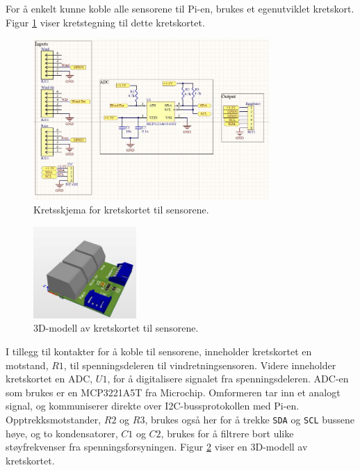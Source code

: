 For å enkelt kunne koble alle sensorene til Pi-en, brukes et egenutviklet kretskort.
Figur \ref{fig:sensorkretskort_krets} viser kretstegning til dette kretskortet.

\begin{figure}[H]
    \centering
    \includegraphics[width=0.8\textwidth]{implementering/vaer/sensorkretskort_krets.png}
    \caption{Kretsskjema for kretskortet til sensorene.}
    \label{fig:sensorkretskort_krets}
\end{figure}


\begin{figure}
    \centering
    \includegraphics[width=0.35\textwidth]{implementering/vaer/sensorkretskort_3d.png}
    \caption{3D-modell av kretskortet til sensorene.}
    \label{fig:sensorkretskort_3d}
\end{figure}

I tillegg til kontakter for å koble til sensorene, inneholder kretskortet en motstand, $R1$, til spenningsdeleren til vindretningsensoren. 
Videre inneholder kretskortet en ADC, $U1$, for å digitalisere signalet fra spenningsdeleren. 
ADC-en som brukes er en MCP3221A5T fra Microchip\cite{adc}. 
Omformeren tar inn et analogt signal, og kommuniserer direkte over I2C-bussprotokollen med Pi-en. 
Opptrekksmotstander, $R2$ og $R3$, brukes også her for å trekke \texttt{SDA} og \texttt{SCL} bussene høye, og to kondensatorer, $C1$ og $C2$, brukes for å filtrere bort ulike støyfrekvenser fra spenningsforsyningen. 
Figur \ref{fig:sensorkretskort_3d} viser en 3D-modell av kretskortet.

